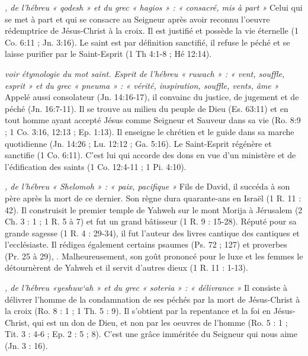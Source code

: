\begin{multicols}{2}
\textit{, de l'hébreu « qodesh » et du grec « hagios » : « consacré, mis à part »}\newline
Celui qui se met à part et qui se consacre au Seigneur après avoir reconnu l'oeuvre rédemptrice de Jésus-Christ à la croix. Il est justifié et possède la vie éternelle (1 Co. 6:11 ; Jn. 3:16). Le saint est par définition sanctifié, il refuse le péché et se laisse purifier par le Saint-Esprit (1 Th 4:1-8 ; Hé 12:14).

\textit{voir étymologie du mot saint. Esprit de l'hébreu « ruwach » : « vent, souffle, esprit » et du grec « pneuma » : « vérité, inspiration, souffle, vents, âme »}\newline
Appelé aussi consolateur (Jn. 14:16-17), il convainc du justice, de jugement et de péché (Jn. 16:7-11). Il se trouve au milieu du peuple de Dieu (Es. 63:11) et en tout homme ayant accepté Jésus comme Seigneur et Sauveur dans sa vie (Ro. 8:9 ; 1 Co. 3:16, 12:13 ; Ep. 1:13). Il enseigne le chrétien et le guide dans sa marche quotidienne (Jn. 14:26 ; Lu. 12:12 ; Ga. 5:16). Le Saint-Esprit régénère et sanctifie (1 Co. 6:11). C'est lui qui accorde des dons en vue d'un ministère et de l'édification des saints (1 Co. 12:4-11 ; 1 Pi. 4:10).

\textit{, de l'hébreu « Shelomoh » : « paix, pacifique »}\newline
Fils de David, il succéda à son père après la mort de ce dernier. Son règne dura quarante-ans en Israël (1 R. 11 : 42). Il construisit le premier temple de Yahweh sur le mont Morija à Jérusalem (2 Ch. 3 : 1 ; 1 R. 5 à 7) et fut un grand bâtisseur (1 R. 9 : 15-28). Réputé pour sa grande sagesse (1 R. 4 : 29-34), il fut l'auteur des livres cantique des cantiques et l'ecclésiaste. Il rédigea également certains psaumes (Ps. 72 ; 127) et proverbes (Pr. 25 à 29), . Malheureusement, son goût prononcé pour le luxe et les femmes le détournèrent de Yahweh et il servit d'autres dieux (1 R. 11 : 1-13).

\textit{, de l'hébreu «yeshuw`ah » et du grec « soteria » : « délivrance »}\newline
Il consiste à délivrer l'homme de la condamnation de ses péchés par la mort de Jésus-Christ à la croix (Ro. 8 : 1 ; 1 Th. 5 : 9). Il s'obtient par la repentance et la foi en Jésus-Christ, qui est un don de Dieu, et non par les oeuvres de l'homme (Ro. 5 : 1 ; Tit. 3 : 4-6 ; Ep. 2 : 5 ; 8). C'est une grâce imméritée du Seigneur qui nous aime (Jn. 3 : 16).


\end{multicols}
